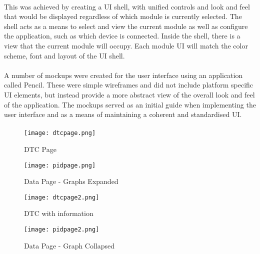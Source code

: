 	\paragraph{}{
	This was achieved by creating a UI shell, with unified controls and look and feel that would be displayed regardless of which module is currently selected. The shell acts as a means to select and view the current module as well as configure the application, such as which device is connected. Inside the shell, there is a view that the current module will occupy. Each module UI will match the color scheme, font and layout of the UI shell.
	}
	\paragraph{}{
	A number of mockups were created for the user interface using an application called Pencil. These were simple wireframes and did not include platform specific UI elements, but instead provide a more abstract view of the overall look and feel of the application. The mockups served as an initial guide when implementing the user interface and as a means of maintaining a coherent and standardised UI. 
	}
	\paragraph{}{
		\begin{figure}[h]
			\begin{center}								
				\begin{minipage}{0.49\textwidth}
					\texttt{[image: dtcpage.png]}
					\caption{DTC Page}
					\vspace*{1cm}
					\texttt{[image: pidpage.png]}
					\caption{Data Page - Graphs Expanded}						
				\end{minipage}
				\hfill			
				\begin{minipage}{0.49\textwidth}
					\texttt{[image: dtcpage2.png]}
					\caption{DTC with information}
					\vspace*{1cm}
					\texttt{[image: pidpage2.png]}
					\caption{Data Page - Graph Collapsed}						
				\end{minipage}									
			\end{center}
		\end{figure}	
	}